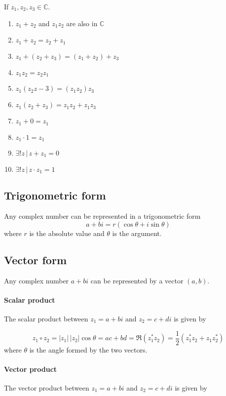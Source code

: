 \documentclass[a4paper]{article}
\begin{document}
If \(z_1, z_2, z_3 \in \mathbb{C}\).
\begin{enumerate}
    \item \(z_1+z_2\) and \(z_1z_2\) are also in \(\mathbb{C}\)
    \item \(z_1+z_2=z_2+z_1\)
    \item \(z_1 + (z_2 + z_3) = (z_1 + z_2) + z_3\)
    \item \(z_1z_2=z_2z_1\)
    \item \(z_1(z_2z-3)=(z_1z_2)z_3\)
    \item \(z_1(z_2+z_3)=z_1z_2+z_1z_3\)
    \item \(z_1+0=z_1\)
    \item \(z_1\cdot 1=z_1\)
    \item \(\exists ! z \,|\, z+z_1=0\)
    \item \(\exists ! z \,|\, z\cdot z_1=1\)
\end{enumerate}

\subsection{Trigonometric form}

Any complex number can be represented in a trigonometric form
\[
    a+bi=r(\cos\theta+i\sin\theta)
\]
where \(r\) is the absolute value and \(\theta\) is the argument.

\subsection{Vector form}

Any complex number \(a+bi\) can be represented by a vector \((a,b)\).

\paragraph{Scalar product}

The scalar product between \(z_1=a+bi\) and \(z_2=c+di\) is given by

\[
    z_1\circ z_2 = |z_1|\,|z_2|\cos\theta
    = ac+bd = \Re(z_1^*z_2) = \frac{1}{2}(z_1^*z_2+z_1z_2^*)
\]
where \(\theta\) is the angle formed by the two vectors.

\paragraph{Vector product}

The vector product between \(z_1=a+bi\) and \(z_2=c+di\) is given by
\end{document}

